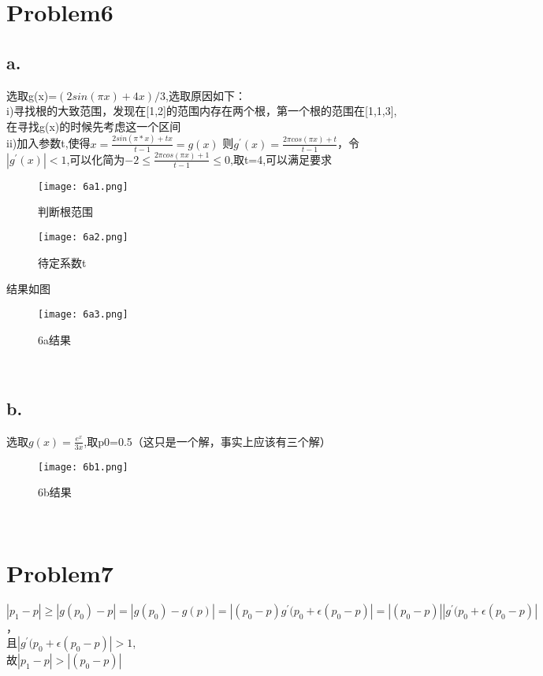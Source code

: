 \documentclass{article}
\begin{document}
\section{Problem6}
\subsection{a.}
选取g(x)=$(2sin(\pi x)+4 x)/3$,选取原因如下：\\

i)寻找根的大致范围，发现在[1,2]的范围内存在两个根，第一个根的范围在[1,1,3],在寻找g(x)的时候先考虑这一个区间\\

ii)加入参数t,使得$x=\frac{2sin(\pi*x)+tx}{t-1}=g(x)$ 则$g^{'}(x)=\frac{2\pi cos(\pi x)+t}{t-1}$，令$|g^{'}(x)|<1$,可以化简为$-2\leq \frac{2\pi cos(\pi x)+1}{t-1} \leq 0$,取t=4,可以满足要求\\

\begin{figure}[h]
\begin{minipage}[t]{0.45\linewidth}
\centering
\texttt{[image: 6a1.png]}
\caption{判断根范围}
\end{minipage}
\begin{minipage}[t]{0.45\linewidth}        
\hspace{2mm}
\texttt{[image: 6a2.png]}
\caption{待定系数t}
\end{minipage}
\end{figure}


结果如图
\begin{figure}[h]
\centering
\texttt{[image: 6a3.png]}
\caption{6a结果}
\label{figure}
\end{figure}\\

\subsection{b.}
选取$g(x)=\frac{e^{x}}{3x}$,取p0=0.5（这只是一个解，事实上应该有三个解）
\begin{figure}[h]
\centering
\texttt{[image: 6b1.png]}
\caption{6b结果}
\label{figure}
\end{figure}\\



\section{Problem7}
$|p_1-p|\geq |g(p_0)-p|= |g(p_0)-g(p)|=|(p_0-p)g^{'}(p_0+\epsilon(p_0-p)|=|(p_0-p)||g^{'}(p_0+\epsilon(p_0-p)|$，\\

且$|g^{'}(p_0+\epsilon(p_0-p)|>1$,\\

故$|p_1-p|>|(p_0-p)|$
\end{document}
